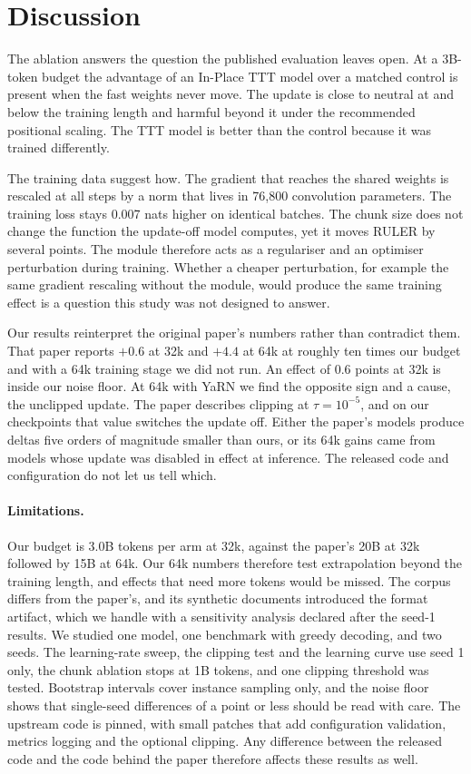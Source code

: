 \documentclass{article}
\begin{document}
\section{Discussion}

The ablation answers the question the published evaluation leaves open. At a 3B-token budget the advantage of an In-Place TTT model over a matched control is present when the fast weights never move. The update is close to neutral at and below the training length and harmful beyond it under the recommended positional scaling. The TTT model is better than the control because it was trained differently.

The training data suggest how. The gradient that reaches the shared weights is rescaled at all steps by a norm that lives in 76,800 convolution parameters. The training loss stays 0.007 nats higher on identical batches. The chunk size does not change the function the update-off model computes, yet it moves RULER by several points. The module therefore acts as a regulariser and an optimiser perturbation during training. Whether a cheaper perturbation, for example the same gradient rescaling without the module, would produce the same training effect is a question this study was not designed to answer.

Our results reinterpret the original paper's numbers rather than contradict them. That paper reports $+0.6$ at 32k and $+4.4$ at 64k at roughly ten times our budget and with a 64k training stage we did not run. An effect of 0.6 points at 32k is inside our noise floor. At 64k with YaRN we find the opposite sign and a cause, the unclipped update. The paper describes clipping at $\tau = 10^{-5}$, and on our checkpoints that value switches the update off. Either the paper's models produce deltas five orders of magnitude smaller than ours, or its 64k gains came from models whose update was disabled in effect at inference. The released code and configuration do not let us tell which.

\paragraph{Limitations.} Our budget is 3.0B tokens per arm at 32k, against the paper's 20B at 32k followed by 15B at 64k. Our 64k numbers therefore test extrapolation beyond the training length, and effects that need more tokens would be missed. The corpus differs from the paper's, and its synthetic documents introduced the format artifact, which we handle with a sensitivity analysis declared after the seed-1 results. We studied one model, one benchmark with greedy decoding, and two seeds. The learning-rate sweep, the clipping test and the learning curve use seed 1 only, the chunk ablation stops at 1B tokens, and one clipping threshold was tested. Bootstrap intervals cover instance sampling only, and the noise floor shows that single-seed differences of a point or less should be read with care. The upstream code is pinned, with small patches that add configuration validation, metrics logging and the optional clipping. Any difference between the released code and the code behind the paper therefore affects these results as well.
\end{document}
